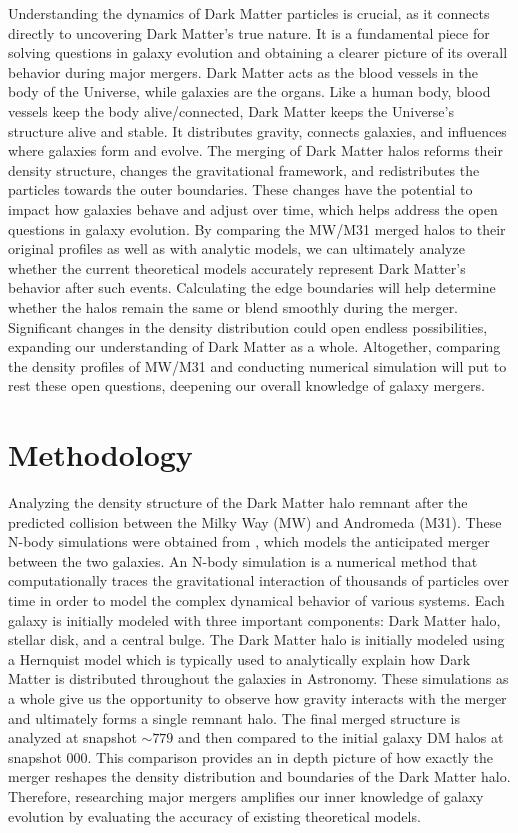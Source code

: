 \documentclass[fleqn,usenatbib]{mnras}
\begin{document}
Understanding the dynamics of Dark Matter particles is crucial, as it connects directly to uncovering Dark Matter's true nature. It is a fundamental piece for solving questions in galaxy evolution and obtaining a clearer picture of its overall behavior during major mergers. Dark Matter acts as the blood vessels in the body of the Universe, while galaxies are the organs. Like a human body, blood vessels keep the body alive/connected, Dark Matter keeps the Universe's structure alive and stable. It distributes gravity, connects galaxies, and influences where galaxies form and evolve. The merging of Dark Matter halos reforms their density structure, changes the gravitational framework, and redistributes the particles towards the outer boundaries. These changes have the potential to impact how galaxies behave and adjust over time, which helps address the open questions in galaxy evolution. By comparing the MW/M31 merged halos to their original profiles as well as with analytic models, we can ultimately analyze whether the current theoretical models accurately represent Dark Matter's behavior after such events. Calculating the edge boundaries will help determine whether the halos remain the same or blend smoothly during the merger. Significant changes in the density distribution could open endless possibilities, expanding our understanding of Dark Matter as a whole. Altogether, comparing the density profiles of MW/M31 and conducting numerical simulation will put to rest these open questions, deepening our overall knowledge of galaxy mergers.
\section{Methodology}
Analyzing the density structure of the Dark Matter halo remnant after the predicted collision between the Milky Way (MW) and Andromeda (M31). These N-body simulations were obtained from \citep{2012Van}, which models the anticipated merger between the two galaxies. An N-body simulation is a numerical method that computationally traces the gravitational interaction of thousands of particles over time in order to model the complex dynamical behavior of various systems. Each galaxy is initially modeled with three important components: Dark Matter halo, stellar disk, and a central bulge. The Dark Matter halo is initially modeled using a Hernquist model which is typically used to analytically explain how Dark Matter is distributed throughout the galaxies in Astronomy. These simulations as a whole give us the opportunity to observe how gravity interacts with the merger and ultimately forms a single remnant halo. The final merged structure is analyzed at snapshot $\sim 779$ and then compared to the initial galaxy DM halos at snapshot 000. This comparison provides an in depth picture of how exactly the merger reshapes the density distribution and boundaries of the Dark Matter halo. Therefore, researching major mergers amplifies our inner knowledge of galaxy evolution by evaluating the accuracy of existing theoretical models. 
\end{document}
